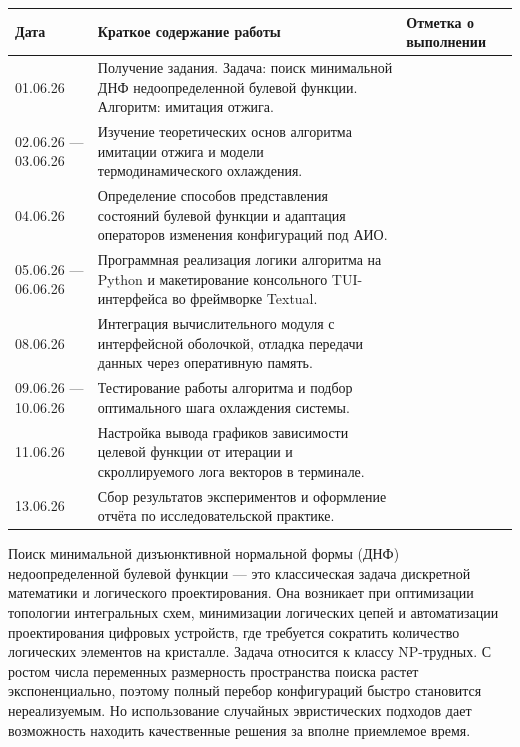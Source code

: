 \documentclass[14pt]{extarticle}
\begin{document}
   




\begin{table}[h!]
\centering
\begin{tabular}{|p{2.5cm}|p{9cm}|p{3cm}|}
\hline
\textbf{Дата} & \textbf{Краткое содержание работы} & \textbf{Отметка о выполнении} \\
\hline
01.06.26 & Получение задания. Задача: поиск минимальной ДНФ недоопределенной булевой функции. Алгоритм: имитация отжига. & \\
\hline
02.06.26 --- 03.06.26 & Изучение теоретических основ алгоритма имитации отжига и модели термодинамического охлаждения. & \\
\hline
04.06.26 & Определение способов представления состояний булевой функции и адаптация операторов изменения конфигураций под АИО. & \\
\hline
05.06.26 --- 06.06.26 & Программная реализация логики алгоритма на Python и макетирование консольного TUI-интерфейса во фреймворке Textual. & \\
\hline
08.06.26 & Интеграция вычислительного модуля с интерфейсной оболочкой, отладка передачи данных через оперативную память. & \\
\hline
09.06.26 --- 10.06.26 & Тестирование работы алгоритма и подбор оптимального шага охлаждения системы. & \\
\hline
11.06.26 & Настройка вывода графиков зависимости целевой функции от итерации и скроллируемого лога векторов в терминале. & \\
\hline
13.06.26 & Сбор результатов экспериментов и оформление отчёта по исследовательской практике. & \\
\hline
\end{tabular}
\end{table}

\newpage


Поиск минимальной дизъюнктивной нормальной формы (ДНФ) недоопределенной булевой функции --- это классическая задача дискретной математики и логического проектирования. Она возникает при оптимизации топологии интегральных схем, минимизации логических цепей и автоматизации проектирования цифровых устройств, где требуется сократить количество логических элементов на кристалле. Задача относится к классу NP-трудных. С ростом числа переменных размерность пространства поиска растет экспоненциально, поэтому полный перебор конфигураций быстро становится нереализуемым. Но использование случайных эвристических подходов дает возможность находить качественные решения за вполне приемлемое время.
\end{document}
